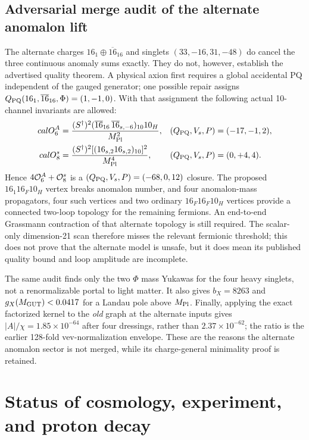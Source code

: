 \documentclass[11pt,a4paper]{article}
\begin{document}
\subsection*{Adversarial merge audit of the alternate anomalon lift}
The alternate charges
$16_{1}\oplus\overline{16}_{16}$ and singlets
$(33,-16,31,-48)$ do cancel the three continuous anomaly sums exactly.
They do not, however, establish the advertised quality theorem. A physical
axion first requires a global accidental PQ independent of the gauged
generator; one possible repair assigns
$Q_{\rm PQ}(16_1,\overline{16}_{16},\Phi)=(1,-1,0)$.
With that assignment the following actual 10-channel invariants are
allowed:
\begin{align}
 {cal O}_{6}^{A}&=\frac{(S^\dagger)^2
   (\overline{16}_{16}\,\overline{16}_{s,-6})_{10}10_H}{M_{\rm Pl}^2},
 &(Q_{\rm PQ},V_s,P)&=(-17,-1,2),\nonumber\\
 {cal O}_{8}^{s}&=\frac{(S^\dagger)^2
   [(16_{s,2}16_{s,2})_{10}]^2}{M_{\rm Pl}^4},
 &(Q_{\rm PQ},V_s,P)&=(0,+4,4).
\end{align}
Hence $4{\cal O}_{6}^{A}+{\cal O}_{8}^{s}$ is a
$(Q_{\rm PQ},V_s,P)=(-68,0,12)$ closure. The proposed
$16_1 16_F10_H$ vertex breaks anomalon number, and four anomalon-mass
propagators, four such vertices and two ordinary $16_F16_F10_H$ vertices
provide a connected two-loop topology for the remaining fermions. An
end-to-end Grassmann contraction of that alternate topology is still
required. The
scalar-only dimension-21 scan therefore misses the relevant fermionic
threshold; this does not prove that the alternate model is unsafe, but it
does mean its published quality bound and loop amplitude are incomplete.

The same audit finds only the two $\Phi$ mass Yukawas for the four heavy
singlets, not a renormalizable portal to light matter. It also gives
$b_X=8263$ and $g_X(M_{\rm GUT})<0.0417$ for a Landau pole above
$M_{\rm Pl}$. Finally, applying the exact factorized kernel to the
\emph{old} graph at the alternate inputs gives
$|A|/\chi=1.85\times10^{-64}$ after four dressings, rather than
$2.37\times10^{-62}$; the ratio is the earlier 128-fold vev-normalization
envelope. These are the reasons the alternate anomalon sector is not
merged, while its charge-general minimality proof is retained.

\section{Status of cosmology, experiment, and proton decay}
\end{document}

